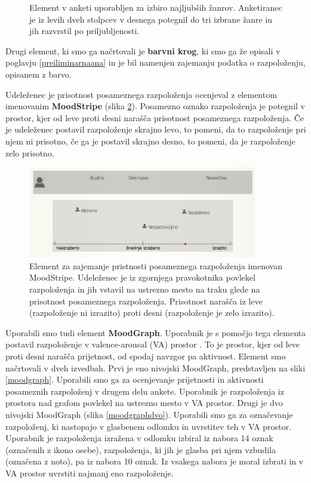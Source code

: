 \documentclass[a4paper, 12pt]{book}
\begin{document}
{\begin{figure}[h!t]
\caption{Element v anketi uporabljen za izbiro najljubših žanrov. Anketiranec je iz levih dveh stolpcev v desnega potegnil do tri izbrane žanre in jih razvrstil po priljubljenosti.}
\label{genresel}
\end{figure}

Drugi element, ki smo ga načrtovali je \textbf{barvni krog}, ki smo ga že opisali v poglavju \ref{preiliminarnaana} in je bil namenjen zajemanju podatka o razpoloženju, opisanem z barvo. 

Udeleženec je prisotnost posameznega razpoloženja ocenjeval z elementom imenovanim \textbf{MoodStripe} (slika \ref{moodstripe}). Posamezno oznako razpoloženja je potegnil v prostor, kjer od leve proti desni narašča prisotnost posameznega razpoloženja. Če je udeleženec postavil razpoloženje skrajno levo, to pomeni, da to razpoloženje pri njem ni prisotno, če ga je postavil skrajno desno, to pomeni, da je razpoloženje zelo prisotno.

\begin{figure}[h!tb]
\centering
\includegraphics[width=10cm]{images/moodstripe.png}

\caption{Element za zajemanje pristnosti posameznega razpoloženja imenovan MoodStripe. Udeleženec je iz zgornjega pravokotnika povlekel razpoloženja in jih vstavil na ustrezno mesto na traku glede na prisotnost posameznega razpoloženja. Prisotnost narašča iz leve (razpoloženje ni izrazito) proti desni (razpoloženje je zelo izrazito). }
\label{moodstripe}
\end{figure}



Uporabili smo tudi element \textbf{MoodGraph}. Uporabnik je s pomočjo tega elementa postavil razpoloženje v valence-arousal (VA) prostor \cite{Colibazzi2010}. To je prostor, kjer od leve proti desni narašča prijetnost, od spodaj navzgor pa aktivnost.   Element smo načrtovali v dveh izvedbah. Prvi je eno nivojski MoodGraph, predstavljen na sliki \ref{moodgraph}. Uporabili smo ga za ocenjevanje prijetnosti in aktivnosti posameznih razpoloženj v drugem delu ankete. Uporabnik je razpoloženja iz prostora nad grafom povlekel na ustrezno mesto v VA prostor. Drugi je dvo nivojski MoodGraph (slika \ref{moodgraphdvo}). Uporabili smo ga za označevanje razpoloženj, ki nastopajo v glasbenem odlomku in uvrstitev teh v VA prostor. Uporabnik je razpoloženja izražena v odlomku izbiral iz nabora 14 oznak (označenih z ikono osebe), razpoloženja, ki jih je glasba pri njem vzbudila (označena z noto), pa iz nabora 10 oznak. Iz vsakega nabora je moral izbrati in v VA prostor uvrstiti najmanj eno razpoloženje. 

}
\end{document}
